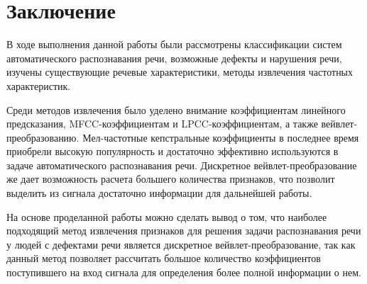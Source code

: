 \chapter*{Заключение}

В ходе выполнения данной работы были рассмотрены классификации систем автоматического распознавания речи, возможные дефекты и нарушения речи, изучены существующие речевые характеристики, методы извлечения частотных характеристик.

Среди методов извлечения было уделено внимание коэффициентам линейного предсказания, MFCC-коэффициентам и LPCC-коэффициентам, а также вейвлет-преобразованию. Мел-частотные кепстральные коэффициенты в последнее время приобрели высокую популярность и достаточно эффективно используются в задаче автоматического распознавания речи. Дискретное вейвлет-преобразование же дает возможность расчета большего количества признаков, что позволит выделить из сигнала достаточно информации для дальнейшей работы.

На основе проделанной работы можно сделать вывод о том, что наиболее подходящий метод извлечения признаков для решения  задачи распознавания речи у людей с дефектами речи является дискретное вейвлет-преобразование, так как данный метод позволяет рассчитать большое количество коэффициентов поступившего на вход сигнала для определения более полной информации о нем. 

